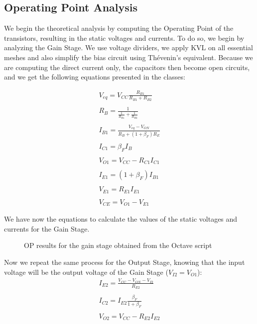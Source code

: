 \subsection{Operating Point Analysis}
\hspace{12pt} We begin the theoretical analysis by computing the Operating Point of the transistors, resulting in the static voltages and currents. To do so, we begin by analyzing the Gain Stage. We use voltage dividers, we apply KVL on all essential meshes and also simplify the bias circuit using Thévenin's equivalent. Because we are computing the direct current only, the capacitors then become open circuits, and we get the following equations presented in the classes:

\small
\begin{gather}
    V_{eq}=V_{CC}\frac{R_{B1}}{R_{B1}+R_{B2}} \nonumber \\
    \nonumber \\ 
    R_{B}=\frac{1}{\frac{1}{R_{B1}}+\frac{1}{R_{B2}}} \nonumber \\
    \nonumber \\
    I_{B1}=\frac{V_{eq}-V_{ON}}{R_B+(1+\beta _F)R_E} \nonumber \\
    \nonumber \\
    I_{C1}=\beta _FI_B \nonumber \\
    \nonumber \\
    V_{O1}=V_{CC}-R_{C1}I_{C1} \nonumber \\
    \nonumber \\
    I_{E1}=(1+\beta _F)I_{B1} \nonumber \\
    \nonumber \\
    V_{E1}=R_{E1}I_{E1} \nonumber \\
    \nonumber \\
    V_{CE}=V_{O1}-V_{E1} \nonumber
\end{gather}
\normalsize

We have now the equations to calculate the values of the static voltages and currents for the Gain Stage.

\begin{figure}[h]
	\centering
	
	\caption{OP results for the gain stage obtained from the Octave script}
	\label{fig:gs_results_th}
\end{figure}
\pagebreak
 
Now we repeat the same process for the Output Stage, knowing that the input voltage will be the output voltage of the Gain Stage ($V_{I2}=V_{O1}$):
\small
\begin{gather}
	I_{E2}=\frac{V_{CC}-V_{ON}-V_{I2}}{R_{E2}} \nonumber \\
    	\nonumber \\
     	I_{C2}=I_{E2}\frac{\beta _F}{1+\beta _F} \nonumber \\
     	\nonumber \\
     	V_{O2}=V_{CC}-R_{E2}I_{E2} \nonumber
\end{gather}
\normalsize
\vspace{15pt}

